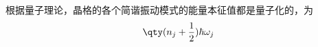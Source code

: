 

根据量子理论，晶格的各个简谐振动模式的能量本征值都是量子化的，为
\begin{equation}
\qty(n_j+\frac{1}{2})\hbar \omega_j
\end{equation}
